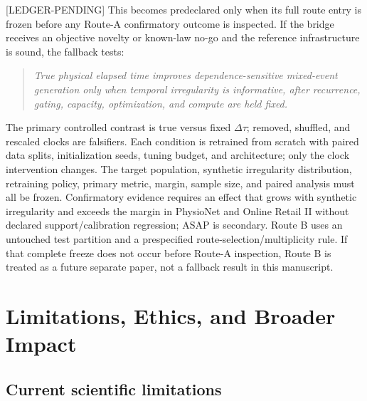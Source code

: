 \documentclass[11pt]{article}
\newcommand{\status}[1]{%
  \textcolor{statusred}{\textbf{\texttt{[#1]}}}%
}
\def\status#1{[#1]}%
\begin{document}
\status{LEDGER-PENDING} This becomes predeclared only when its full route entry is frozen before any Route-A confirmatory outcome is inspected. If the bridge receives an objective novelty or known-law no-go and the reference infrastructure is sound, the fallback tests:

\begin{quote}
\itshape True physical elapsed time improves dependence-sensitive mixed-event generation only when temporal irregularity is informative, after recurrence, gating, capacity, optimization, and compute are held fixed.
\end{quote}

The primary controlled contrast is true versus fixed \(\Delta\tau\); removed, shuffled, and rescaled clocks are falsifiers. Each condition is retrained from scratch with paired data splits, initialization seeds, tuning budget, and architecture; only the clock intervention changes. The target population, synthetic irregularity distribution, retraining policy, primary metric, margin, sample size, and paired analysis must all be frozen. Confirmatory evidence requires an effect that grows with synthetic irregularity and exceeds the margin in PhysioNet and Online Retail II without declared support/\allowbreak{}calibration regression; ASAP is secondary. Route B uses an untouched test partition and a prespecified route-selection/\allowbreak{}multiplicity rule. If that complete freeze does not occur before Route-A inspection, Route B is treated as a future separate paper, not a fallback result in this manuscript.

\section{Limitations, Ethics, and Broader Impact}
\label{sec:limitations-ethics-and-broader-impact}

\subsection{Current scientific limitations}
\label{sec:current-scientific-limitations}
\end{document}

